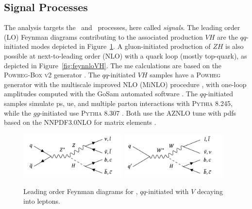 \subsection{Signal Processes}
The analysis targets the \vhb\ and \vhc\ processes, here called \textit{signals}. The leading order (LO) Feynman diagrams contributing to the associated production $VH$ are the $qq$-initiated modes depicted in Figure~\ref{fig:feynloVH}. A gluon-initiated production of $ZH$ is also possible at next-to-leading order (NLO) with a quark loop (mostly top-quark), as depicted in Figure~\ref{fig:feynnloVH}. The \gls{me} calculations are based on the \textsc{Powheg-Box v2} generator \cite{StefanoFrixione_20072, POWHEGBOX}. The $qq$-initiated $VH$ samples have a \textsc{Powheg} generator with the multiscale improved NLO (MiNLO) procedure \cite{powhegHW}, with one-loop amplitudes computed with the GoSam automated software \cite{gosam}. The $qq$-initiated samples simulate \gls{ps}, \gls{ue}, and multiple parton interactions with \textsc{Pythia} 8.245, while the $gg$-initiated use \textsc{Pythia} 8.307 \cite{SJOSTRAND2015159}. Both use the AZNLO tune \cite{measureZGboson} with \gls{pdf}s based on the \textsc{NNPDF3.0NLO} for matrix elements \cite{PDFLHCrun2}. \\

\begin{figure}[h!]
  \center
  \includegraphics[width=0.48\textwidth]{Images/VH/Feynman/zh.png}
  \includegraphics[width=0.48\textwidth]{Images/VH/Feynman/wh.png}
  \caption{Leading order Feynman diagrams for \vhbc, $qq$-initiated with $V$ decaying into leptons.} 
  \label{fig:feynloVH}
\end{figure}


